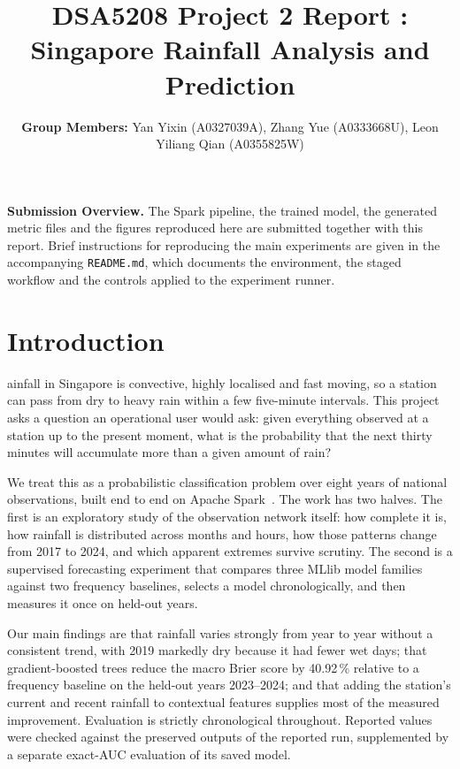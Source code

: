 \documentclass[10pt,a4paper,twocolumn,twoside]{rho-class/rho}
\title{DSA5208 Project 2 Report : Singapore Rainfall Analysis and Prediction}
\author{\textbf{Group Members: }Yan Yixin (A0327039A), Zhang Yue (A0333668U), Leon Yiliang Qian (A0355825W)}
\begin{document}
    \maketitle
    \thispagestyle{firststyle}


\noindent\textbf{Submission Overview.} The Spark pipeline, the trained model, the generated metric files and the figures reproduced here are submitted together with this report. Brief instructions for reproducing the main experiments are given in the accompanying \texttt{README.md}, which documents the environment, the staged workflow and the controls applied to the experiment runner.

\section{Introduction}
ainfall in Singapore is convective, highly localised and fast moving, so a station can pass from dry to heavy rain within a few five-minute intervals. This project asks a question an operational user would ask: given everything observed at a station up to the present moment, what is the probability that the next thirty minutes will accumulate more than a given amount of rain?

We treat this as a probabilistic classification problem over eight years of national observations, built end to end on Apache Spark~\cite{Lecture4}. The work has two halves. The first is an exploratory study of the observation network itself: how complete it is, how rainfall is distributed across months and hours, how those patterns change from 2017 to 2024, and which apparent extremes survive scrutiny. The second is a supervised forecasting experiment that compares three MLlib model families against two frequency baselines, selects a model chronologically, and then measures it once on held-out years.

Our main findings are that rainfall varies strongly from year to year without a consistent trend, with 2019 markedly dry because it had fewer wet days; that gradient-boosted trees reduce the macro Brier score by 40.92\,\% relative to a frequency baseline on the held-out years 2023--2024; and that adding the station's current and recent rainfall to contextual features supplies most of the measured improvement. Evaluation is strictly chronological throughout. Reported values were checked against the preserved outputs of the reported run, supplemented by a separate exact-AUC evaluation of its saved model.
\end{document}

